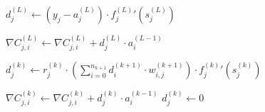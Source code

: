 \documentclass{article}
\begin{document}
          \begin{algorithm}
            \caption{%
              Modified version of algorithm \ref{algadjustgradient} with dropout
              regularization.
            } \label{algadjustgradientdropout}
            \begin{algorithmic}
                  \State $
                    d_j^{(L)} \gets
                      \left( y_j - a_j^{(L)} \right)
                      \cdot
                      {f_j^{(L)}}' \left( s_j^{(L)} \right)
                  $

                    \State $
                      \nabla C_{j,i}^{(L)} \gets
                        \nabla C_{j,i}^{(L)} + d_j^{(L)} \cdot a_i^{(L-1)}
                    $
                  \EndFor
                \EndFor

                      \State $
                        d_j^{(k)} \gets
                          r_j^{(k)}
                          \cdot
                          \left(
                            \sum_{i=0}^{n_{k+1}} d_i^{(k+1)} \cdot w_{i,j}^{(k+1)}
                          \right)
                          \cdot
                          {f_j^{(k)}}' \left( s_j^{(k)} \right)
                      $

                        \State $
                          \nabla C_{j,i}^{(k)} \gets
                            \nabla C_{j,i}^{(k)} + d_j^{(k)} \cdot a_i^{(k-1)}
                        $
                      \EndFor
                    \Else
                      \State $d_j^{(k)} \gets 0$
                    \EndIf
                  \EndFor
                \EndFor
              \EndProcedure
            \end{algorithmic}
          \end{algorithm}
\end{document}
